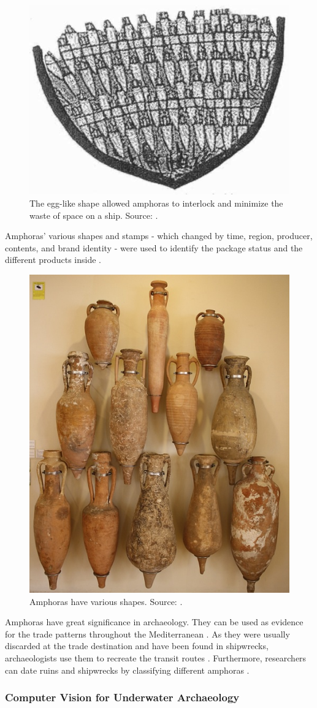 \documentclass[a4paper, 11pt, oneside]{article}
\begin{document}
\begin{figure}[ht]
  \begin{center}
    \includegraphics[width=.4\textwidth]{amphora_stowage_aboard_ship.png}
  \end{center}
  \caption{The egg-like shape allowed amphoras to interlock and minimize the waste of space on a ship.
  Source: \cite{twede2002commercial}.}
\end{figure}

Amphoras' various shapes and stamps - which changed by time, region, producer, contents, and brand
identity - were used to identify the package status and the different products inside
\cite{twede2002commercial, worldhistory}.

\begin{figure}[ht]
  \begin{center}
    \includegraphics[width=.3\textwidth]{amphora_various_shapes.jpg}
  \end{center}
  \caption{Amphoras have various shapes. Source: \cite{worldhistory}.}
  \label{fig:amphora}
\end{figure}

Amphoras have great significance in archaeology. They can be used as evidence for the trade patterns throughout
the Mediterranean \cite{twede2002commercial}. As they were usually discarded at the trade destination and have been
found in shipwrecks, archaeologists use them to recreate the transit routes \cite{twede2002commercial}. Furthermore,
researchers can date ruins and shipwrecks by classifying different amphoras \cite{twede2002commercial, grace1985middle}.

\subsubsection{Computer Vision for Underwater Archaeology}
\end{document}
